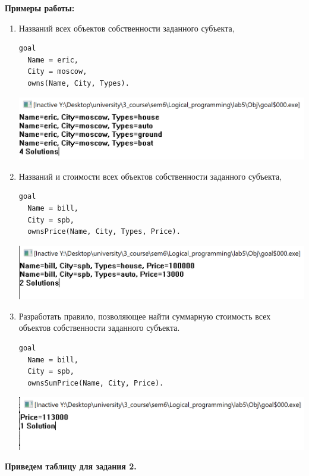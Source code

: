 \documentclass[a4paper,14pt]{extreport} %
\begin{document}
\textbf{Примеры работы:}
\begin{enumerate}
\item Названий всех объектов собственности заданного субъекта,

\begin{lstlisting}
goal
  Name = eric,
  City = moscow,
  owns(Name, City, Types).
\end{lstlisting}

\includegraphics[scale=0.8]{ex1}

\item Названий и стоимости всех объектов собственности заданного субъекта,

\begin{lstlisting}
goal
  Name = bill,
  City = spb,
  ownsPrice(Name, City, Types, Price).
\end{lstlisting}

\includegraphics[scale=0.8]{ex2}

\item Разработать правило, позволяющее найти суммарную стоимость всех объектов собственности заданного субъекта.

\begin{lstlisting}
goal
  Name = bill,
  City = spb,
  ownsSumPrice(Name, City, Price).
\end{lstlisting}

\includegraphics[scale=0.8]{ex3}

\end{enumerate}

\textbf{Приведем таблицу для задания 2. }
\end{document}
